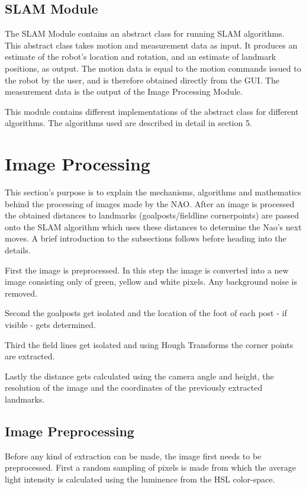 \documentclass{ba-kecs}
\numberwithin{figure}{section}
\numberwithin{equation}{section}
\begin{document}
\subsection{SLAM Module}
The SLAM Module contains an abstract class for running SLAM algorithms. This abstract class takes motion and measurement data as input. It produces an estimate of the robot's location and rotation, and an estimate of landmark positions, as output. The motion data is equal to the motion commands issued to the robot by the user, and is therefore obtained directly from the GUI. The measurement data is the output of the Image Processing Module.

This module contains different implementations of the abstract class for different algorithms. The algorithms used are described in detail in section 5.






\section{Image Processing}

This section's purpose is to explain the mechanisms, algorithms and mathematics behind the processing of images made by the NAO.
After an image is processed the obtained distances to landmarks (goalposts/fieldline cornerpoints) are passed onto the SLAM algorithm which uses these distances to determine the Nao's next moves.
A brief introduction to the subsections follows before heading into the details.

First the image is preprocessed. In this step the image is converted into a new image consisting only of green, yellow and white pixels. Any background noise is removed.

Second the goalposts get isolated and the location of the foot of each post - if visible - gets determined.

Third the field lines get isolated and using Hough Transforms the corner points are extracted.

Lastly the distance gets calculated using the camera angle and height, the resolution of the image and the coordinates of the previously extracted landmarks.

\subsection{Image Preprocessing}
Before any kind of extraction can be made, the image first needs to be preprocessed. First a random sampling of pixels is made from which the average light intensity is calculated using the luminence from the HSL color-space.
\end{document}
